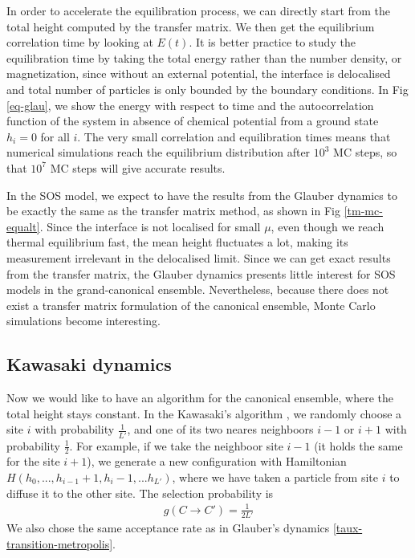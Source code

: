 In order to accelerate the equilibration process, we can directly start from the total height computed by the transfer matrix. We then get the equilibrium correlation time by looking at $E(t)$. It is better practice to study the equilibration time by taking the total energy rather than the number density, or magnetization, since without an external potential, the interface is delocalised and total number of particles is only bounded by the boundary conditions. In Fig \ref{eq-glau}, we show the energy with respect to time and the autocorrelation function of the system in absence of chemical potential from a ground state $h_i=0$ for all $i$. The very small correlation and equilibration times means that numerical simulations reach the equilibrium distribution after $10^3$ MC steps, so that $10^7$ MC steps will give accurate results.

In the SOS model, we expect to have the results from the Glauber dynamics to be exactly the same as the transfer matrix method, as shown in Fig \ref{tm-mc-equalt}. Since the interface is not localised for small $\mu$, even though we reach thermal equilibrium fast, the mean height  fluctuates a lot, making its measurement irrelevant in the delocalised limit. Since we can get exact results from the transfer matrix, the Glauber dynamics presents little interest for SOS models in the grand-canonical ensemble. Nevertheless, because there does not exist a transfer matrix formulation of the canonical ensemble, Monte Carlo simulations become interesting.

\subsection{Kawasaki dynamics}
\label{algo-kawasaki}

Now we would like to have an algorithm for the canonical ensemble, where the total height stays constant. In the Kawasaki's algorithm \cite{kawasaki_diffusion_1966}, we randomly choose a site $i$ with probability $\frac{1}{L'}$, and one of its two neares neighboors $i-1$ or $i+1$ with probability $\frac{1}{2}$. For example, if we take the neighboor site $i-1$ (it holds the same for the site $i+1$), we generate a new configuration with Hamiltonian $H(h_0,...,h_{i-1}+1,h_i-1,...h_{L'})$, where we have taken a particle from site $i$ to diffuse it to the other site.
The selection probability is
\begin{align}
g(C\to C') = \frac{1}{2L'}
\end{align}
We also chose the same acceptance rate as in Glauber's dynamics \eqref{taux-transition-metropolis}.

